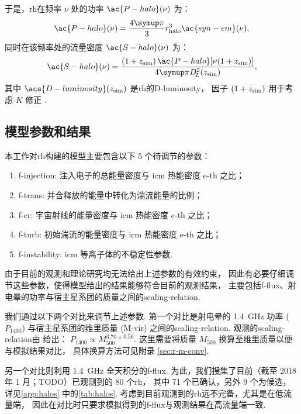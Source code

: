于是，\ac{rh}在频率 $\nu$ 处的功率 $\ac{P-halo}(\nu)$ 为：
\begin{equation}
  \label{eq:halo-power}
  \ac{P-halo}(\nu) = \frac{4\Cpi}{3} r_{\R{halo}}^3 \ac{syn-em}(\nu) ,
\end{equation}
同时在该频率处的流量密度 $\ac{S-halo}(\nu)$ 为：
\begin{equation}
  \label{eq:halo-flux}
  \ac{S-halo}(\nu) =
    \frac{(1+z_{\R{sim}}) \,\ac{P-halo}[\nu(1+z_{\R{sim}})]}{
      4\Cpi D_{\!L}^2(z_{\R{sim}})} ,
\end{equation}
其中
$\acs{D-luminosity}(z_{\R{sim}})$ 是\ac{rh}的\acl{D-luminosity}，
因子 $(1 + z_{\mathrm{sim}})$ 用于考虑 $K$ 修正 \cite{hogg1999}.

\subsection{模型参数和结果}
\label{sec:halo-results}

本工作对\ac{rh}构建的模型主要包含以下 5 个待调节的参数：
\begin{enumerate}
  \item \ac{f-injection}:
    注入电子的总能量密度与 \ac{icm} 热能密度 \ac{e-th} 之比；
  \item \ac{f-trans}:
    并合释放的能量中转化为湍流能量的比例；
  \item \ac{f-cr}:
    宇宙射线的能量密度与 \ac{icm} 热能密度 \ac{e-th} 之比；
  \item \ac{f-turb}:
    初始湍流的能量密度与 \ac{icm} 热能密度 \ac{e-th} 之比；
  \item \ac{f-instability}:
    \ac{icm} 等离子体的不稳定性参数.
\end{enumerate}
由于目前的观测和理论研究均无法给出上述参数的有效约束，
因此有必要仔细调节这些参数，使得模型给出的结果能够符合目前的观测结果，
主要包括\ac{f-flux}、射电晕的功率与宿主星系团的质量之间的\ac{scaling-relation}.

我们通过以下两个对比来调节上述参数.
第一个对比是射电晕的 \SI{1.4}{\GHz} 功率 ($P_{1400}$)
与宿主星系团的维里质量 (\ac{M-vir}) 之间的\ac{scaling-relation}.
观测的\ac{scaling-relation}由  给出：
$P_{1400} \propto M_{500}^{3.70 \pm 0.56}$.
这里需要将质量 $M_{500}$ 换算至维里质量以便与模拟结果对比，
具体换算方法可见附录 \autoref{sec:r-m-conv}.

另一个对比则利用 \SI{1.4}{\GHz} 全天积分的\ac{f-flux}.
为此，我们搜集了目前（截至 2018 年 1 月；TODO）已观测到的 80 个\ac{rh}，
其中 71 个已确认，另外 9 个为候选，
详见\autoref{app:halos} 中的\autoref{tab:halos}.
考虑到目前观测到的\ac{rh}远不完备，尤其是在低流量端，
因此在对比时只要求模拟得到的\ac{f-flux}与观测结果在高流量端一致.

